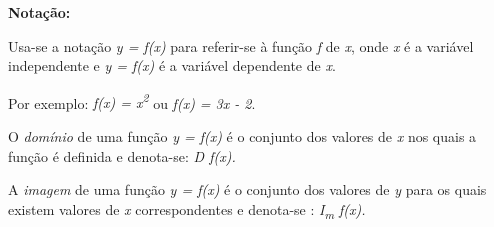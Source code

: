 \begin{caixa}
\textbf{Notação:}

Usa-se a notação \textit{y = f(x)} para referir-se à função \textit{f} de \textit{x}, onde \textit{x} é a variável independente e \textit{y = f(x)}  é a variável dependente de \textit{x}.

Por exemplo:   \textit{f(x) = x\textsuperscript{2}}        ou      \textit{f(x) = 3x - 2}.
\end{caixa}

\begin{caixa}
\begin{tdefinicao}
O \textit{domínio} de uma função \textit{y = f(x)} é o conjunto dos valores de \textit{x} nos quais a função é definida e denota-se:   \textit{D f(x).}
\end{tdefinicao}

\begin{tdefinicao}
A \textit{imagem} de uma função \textit{y = f(x)} é o conjunto dos valores de \textit{y }para os quais existem valores de \textit{x} correspondentes e denota-se : \textit{I\textsubscript{m} f(x).}
\end{tdefinicao}
\end{caixa}

